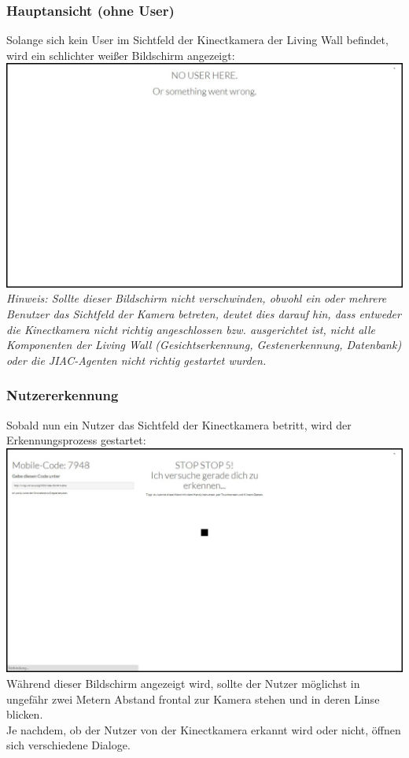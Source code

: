 \documentclass[10pt,a4paper]{report}
\begin{document}
		\subsubsection{Hauptansicht (ohne User)}
		Solange sich kein User im Sichtfeld der Kinectkamera der Living Wall befindet, wird ein schlichter weißer Bildschirm angezeigt: \\
		\includegraphics[scale=0.31]{NoUser} \\
		\textit{Hinweis: Sollte dieser Bildschirm nicht verschwinden, obwohl ein oder mehrere Benutzer das Sichtfeld der Kamera betreten, deutet dies darauf hin, dass entweder die Kinectkamera nicht richtig angeschlossen bzw. ausgerichtet ist, nicht alle Komponenten der Living Wall (Gesichtserkennung, Gestenerkennung, Datenbank) oder die JIAC-Agenten nicht richtig gestartet wurden.}
		\subsubsection{Nutzererkennung}
		Sobald nun ein Nutzer das Sichtfeld der Kinectkamera betritt, wird der Erkennungsprozess gestartet:\\
		\includegraphics[scale=0.31]{Erkennung}\\Während dieser Bildschirm angezeigt wird, sollte der Nutzer möglichst in ungefähr zwei Metern Abstand frontal zur Kamera stehen und in deren Linse blicken.\\
Je nachdem, ob der Nutzer von der Kinectkamera erkannt wird oder nicht, öffnen sich verschiedene Dialoge.
\end{document}
